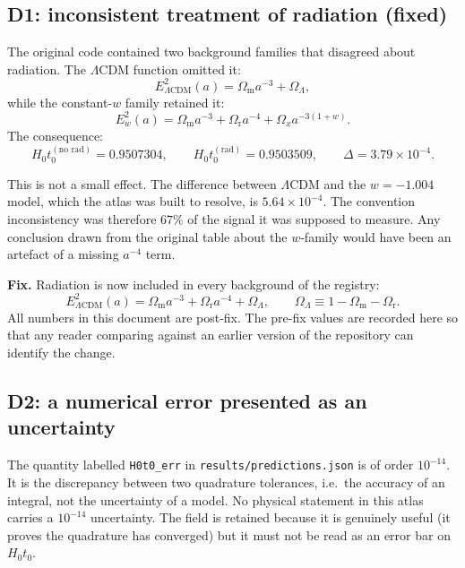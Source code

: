 \documentclass[11pt,a4paper]{article}
\theoremstyle{definition}
\newcommand{\Omm}{\Omega_{\mathrm{m}}}
\newcommand{\Omr}{\Omega_{\mathrm{r}}}
\newcommand{\OmL}{\Omega_{\Lambda}}
\newcommand{\Hzt}{H_0 t_0}
\begin{document}
\subsection{D1: inconsistent treatment of radiation (fixed)}

The original code contained two background families that disagreed about
radiation. The $\Lambda$CDM function omitted it:
\begin{equation}
E^2_{\Lambda\mathrm{CDM}}(a) = \Omm a^{-3} + \OmL ,
\end{equation}
while the constant-$w$ family retained it:
\begin{equation}
E^2_{w}(a) = \Omm a^{-3} + \Omr a^{-4} + \Omega_x a^{-3(1+w)} .
\end{equation}
The consequence:
\begin{equation}
\Hzt^{(\text{no rad})} = 0.9507304, \qquad
\Hzt^{(\text{rad})} = 0.9503509, \qquad
\Delta = 3.79\times10^{-4}.
\end{equation}

This is not a small effect. The difference between $\Lambda$CDM and the
$w = -1.004$ model, which the atlas was built to resolve, is
$5.64\times10^{-4}$. The convention inconsistency was therefore $67\%$ of the
signal it was supposed to measure. Any conclusion drawn from the original
table about the $w$-family would have been an artefact of a missing
$a^{-4}$ term.

\textbf{Fix.} Radiation is now included in every background of the registry:
\begin{equation}
E^2_{\Lambda\mathrm{CDM}}(a) = \Omm a^{-3} + \Omr a^{-4} + \OmL,
\qquad \OmL \equiv 1 - \Omm - \Omr .
\end{equation}
All numbers in this document are post-fix. The pre-fix values are recorded
here so that any reader comparing against an earlier version of the
repository can identify the change.

\subsection{D2: a numerical error presented as an uncertainty}

The quantity labelled \texttt{H0t0\_err} in \texttt{results/predictions.json}
is of order $10^{-14}$. It is the discrepancy between two quadrature
tolerances, i.e.\ the accuracy of an integral, not the uncertainty of a model.
No physical statement in this atlas carries a $10^{-14}$ uncertainty. The
field is retained because it is genuinely useful (it proves the quadrature
has converged) but it must not be read as an error bar on $\Hzt$.
\end{document}
